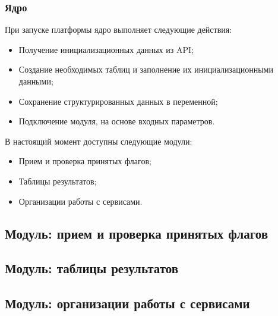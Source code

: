 \subsubsection{Ядро}

При запуске платформы ядро выполняет следующие действия:
\begin{itemize} 
\item Получение инициализационных данных из API;
\item Создание необходимых таблиц и заполнение их инициализационными данными; 
\item Сохранение структурированных данных в переменной;
\item Подключение модуля, на основе входных параметров.
\end{itemize}

В настоящий момент доступны следующие модули:
\begin{itemize} 
\item Прием и проверка принятых флагов;
\item Таблицы результатов; 
\item Организации работы с сервисами.
\end{itemize}


\subsection{Модуль: прием и проверка принятых флагов} %


\subsection{Модуль: таблицы результатов} %


\subsection{Модуль: организации работы с сервисами} %

